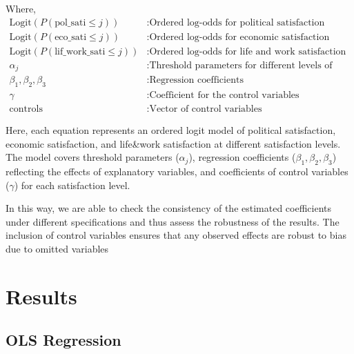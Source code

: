 \documentclass{article}
\begin{document}
\vspace{\baselineskip}
Where,
\begin{align*}
\text{Logit}(P(\text{pol\_sati} \leq j)) & : \text{Ordered log-odds for political satisfaction} \\
\text{Logit}(P(\text{eco\_sati} \leq j)) & : \text{Ordered log-odds for economic satisfaction} \\
\text{Logit}(P(\text{lif\_work\_sati} \leq j)) & : \text{Ordered log-odds for life and work satisfaction} \\
\alpha_j & : \text{Threshold parameters for different levels of satisfaction} \\
\beta_1, \beta_2, \beta_3 & : \text{Regression coefficients} \\
\gamma & : \text{Coefficient for the control variables} \\
\text{controls} & : \text{Vector of control variables}
\end{align*}

Here, each equation represents an ordered logit model of political satisfaction, economic satisfaction, and life\&work satisfaction at different satisfaction levels. The model covers threshold parameters ($\alpha_j$), regression coefficients ($\beta_1, \beta_2, \beta_3$) reflecting the effects of explanatory variables, and coefficients of control variables ($\gamma$) for each satisfaction level.

In this way, we are able to check the consistency of the estimated coefficients under different specifications and thus assess the robustness of the results. The inclusion of control variables ensures that any observed effects are robust to bias due to omitted variables
\section{Results}
\subsection{OLS Regression}

\end{document}
